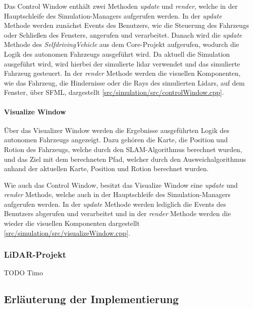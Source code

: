 Das Control Window enthält zwei Methoden \textit{update} und \textit{render}, welche in der Hauptschleife des Simulation-Managers aufgerufen werden. In der \textit{update} Methode werden zunächst Events des Benutzers, wie die Steuerung des Fahrzeugs oder Schließen des Fensters, angerufen und verarbeitet. Danach wird die \textit{update} Methode des \textit{SelfdrivingVehicle} aus dem Core-Projekt aufgerufen, wodurch die Logik des autonomen Fahrzeugs ausgeführt wird. Da aktuell die Simulation ausgeführt wird, wird hierbei der simulierte \ac{lidar} verwendet und das simulierte Fahrzeug gesteuert. In der \textit{render} Methode werden die visuellen Komponenten, wie das Fahrzeug, die Hindernisse oder die Rays des simulierten Lidars, auf dem Fenster, über SFML, dargestellt [\href{https://github.com/Jundy0/Studienarbeit/blob/main/src/simulation/src/controlWindow.cpp}{src/simulation/src/controlWindow.cpp}]. 

\paragraph{Visualize Window} \mbox{}

Über das Visualizer Window werden die Ergebnisse ausgeführten Logik des autonomen Fahrzeugs angezeigt. Dazu gehören die Karte, die Position und Rotion des Fahrzeugs, welche durch den SLAM-Algorithmus berechnet wurden, und das Ziel mit dem berechneten Pfad, welcher durch den Ausweichalgorithmus anhand der aktuellen Karte, Position und Rotion berechnet wurden. 

Wie auch das Control Window, besitzt das Visualize Window eine \textit{update} und \textit{render} Methode, welche auch in der Hauptschleife des Simulation-Managers aufgerufen werden. In der \textit{update} Methode werden lediglich die Events des Benutzers abgerufen und verarbeitet und in der \textit{render} Methode werden die wieder die visuellen Komponenten dargestellt [\href{https://github.com/Jundy0/Studienarbeit/blob/main/src/simulation/src/visualizeWindow.cpp}{src/simulation/src/visualizeWindow.cpp}]. 

\subsubsection{LiDAR-Projekt}

TODO Timo

\subsection{Erläuterung der Implementierung}

